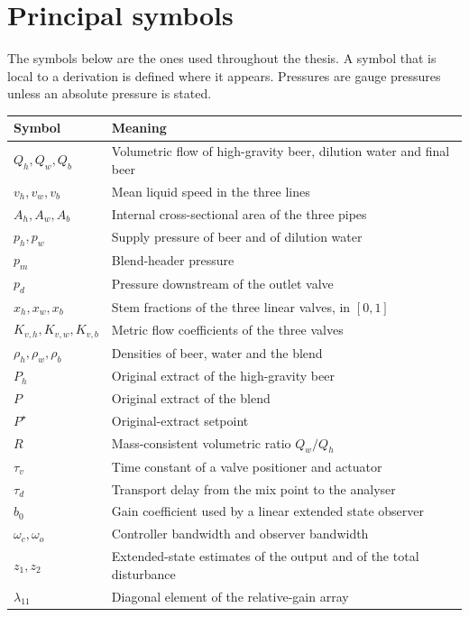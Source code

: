 \documentclass[12pt,a4paper]{report}
\begin{document}
\chapter*{Principal symbols}
\noindent
The symbols below are the ones used throughout the thesis. A symbol that is local to a derivation is defined where it appears. Pressures are gauge pressures unless an absolute pressure is stated.

\begin{center}
\begin{tabular}{@{}ll@{}}
\toprule
Symbol & Meaning \\
\midrule
$Q_h,Q_w,Q_b$ & Volumetric flow of high-gravity beer, dilution water and final beer \\
$v_h,v_w,v_b$ & Mean liquid speed in the three lines \\
$A_h,A_w,A_b$ & Internal cross-sectional area of the three pipes \\
$p_h,p_w$ & Supply pressure of beer and of dilution water \\
$p_m$ & Blend-header pressure \\
$p_d$ & Pressure downstream of the outlet valve \\
$x_h,x_w,x_b$ & Stem fractions of the three linear valves, in $[0,1]$ \\
$K_{v,h},K_{v,w},K_{v,b}$ & Metric flow coefficients of the three valves \\
$\rho_h,\rho_w,\rho_b$ & Densities of beer, water and the blend \\
$P_h$ & Original extract of the high-gravity beer \\
$P$ & Original extract of the blend \\
$P^\star$ & Original-extract setpoint \\
$R$ & Mass-consistent volumetric ratio $Q_w/Q_h$ \\
$\tau_v$ & Time constant of a valve positioner and actuator \\
$\tau_d$ & Transport delay from the mix point to the analyser \\
$b_0$ & Gain coefficient used by a linear extended state observer \\
$\omega_c,\omega_o$ & Controller bandwidth and observer bandwidth \\
$z_1,z_2$ & Extended-state estimates of the output and of the total disturbance \\
$\lambda_{11}$ & Diagonal element of the relative-gain array \\
\bottomrule
\end{tabular}
\end{center}

\tableofcontents
\listoffigures
\listoftables

\clearpage
{}







\end{document}
